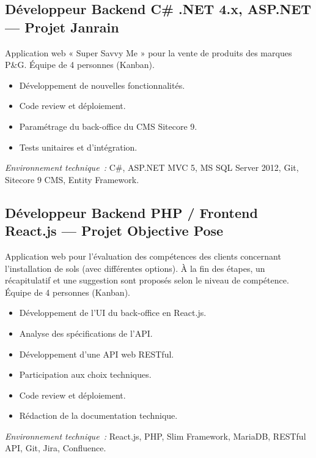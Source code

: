 \documentclass[10pt,a4paper]{article}
\begin{document}
\subsection*{Développeur Backend C\# .NET 4.x, ASP.NET --- Projet Janrain}
\color{darkgray}
Application web « Super Savvy Me » pour la vente de produits des marques P\&G. Équipe de 4 personnes (Kanban).
\begin{itemize}
  \item Développement de nouvelles fonctionnalités.
  \item Code review et déploiement.
  \item Paramétrage du back-office du CMS Sitecore 9.
  \item Tests unitaires et d'intégration.
\end{itemize}
\textit{Environnement technique~:} C\#, ASP.NET MVC 5, MS SQL Server 2012, Git, Sitecore 9 CMS, Entity Framework.

\vspace{6pt}

\subsection*{Développeur Backend PHP / Frontend React.js --- Projet Objective Pose}
\color{darkgray}
Application web pour l'évaluation des compétences des clients concernant l'installation de sols (avec différentes options). À la fin des étapes, un récapitulatif et une suggestion sont proposés selon le niveau de compétence. Équipe de 4 personnes (Kanban).
\begin{itemize}
  \item Développement de l'UI du back-office en React.js.
  \item Analyse des spécifications de l'API.
  \item Développement d'une API web RESTful.
  \item Participation aux choix techniques.
  \item Code review et déploiement.
  \item Rédaction de la documentation technique.
\end{itemize}
\textit{Environnement technique~:} React.js, PHP, Slim Framework, MariaDB, RESTful API, Git, Jira, Confluence.

\vspace{6pt}
\end{document}
